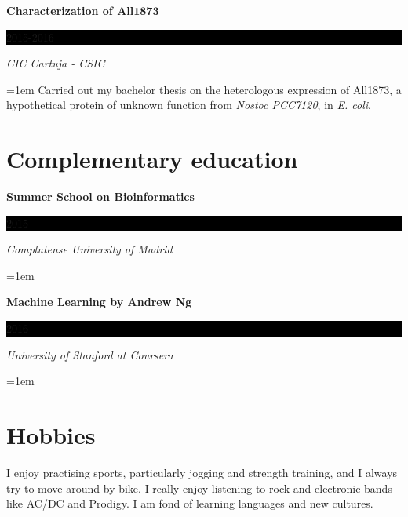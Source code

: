 \documentclass[paper=a4,fontsize=11pt]{article} %
\newlength{\spacebox}
\newcommand{\sepspace}{\vspace*{1em}}		%
\newcommand{\NewPart}[1]{\section*{
									{#1}}}
\newcommand{\PersonalEntry}[2]{
		\noindent\hangindent=2em\hangafter=0 %
		\parbox{\spacebox}{        %
		\textit{#1}}		       %
		\hspace{1.5em} #2 \par}    %
\newcommand{\EducationEntry}[4]{
		\noindent \textbf{#1} \hfill      %
		\colorbox{Black}{%
			\parbox{6em}{%
			\hfill\color{White}#2}} \par  %
		\noindent \textit{#3} \par        %
		\noindent\hangindent=1em\hangafter=0 \small #4 %
		\normalsize \par}
\newcommand{\AwardEntry}[4]{
		\noindent \textbf{#1} \hfill      %
		\colorbox{Black}{%
			\parbox{3em}{%
			\hfill\color{White}#2}} \par  %
		\noindent \textit{#3} \par        %
		  \noindent\hangindent=1em\hangafter=0 \small #4  %
		\normalsize \par}
\newcommand{\VolunteeringEntry}[2]{      %
		\noindent\hangindent=2em\hangafter=0 %
		\parbox{\spacebox}{        %
		\textit{#1}}			   %
		\hspace{1.5em} #2 \par}    %
\begin{document}
\EducationEntry{Characterization of All\begin{math}\boldsymbol{1873}\end{math}}{2015-2016}{CIC Cartuja - CSIC}{Carried out my bachelor thesis on the heterologous expression of All1873, a hypothetical protein of unknown function from \textit{Nostoc PCC7120}, in \textit{E. coli}.}
  
  






  


  
  
\NewPart{Complementary education}{}


\AwardEntry{Summer School on Bioinformatics}{2015}{Complutense University of Madrid}{}  
  


\AwardEntry{Machine Learning by Andrew Ng}{2016}{University of Stanford at Coursera}{}






%
%


\NewPart{Hobbies}
I enjoy practising sports, particularly jogging and strength training, and I always try to move around by bike. I really enjoy listening to rock and electronic bands like AC/DC and Prodigy. I am fond of learning languages and new cultures.
\end{document}
